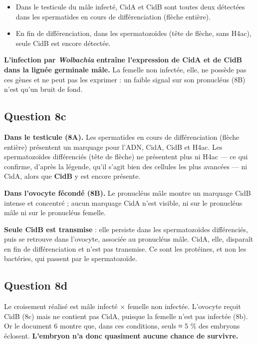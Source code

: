\documentclass[11pt,a4paper]{article}
\providecommand{\tightlist}{\setlength{\itemsep}{0pt}\setlength{\parskip}{0pt}}
\begin{document}
\begin{itemize}
\tightlist
\item
  Dans le testicule du mâle infecté, CidA et CidB sont toutes deux détectées dans les spermatides en cours de différenciation (flèche entière).
\item
  En fin de différenciation, dans les spermatozoïdes (tête de flèche, sans H4ac), seule CidB est encore détectée.
\end{itemize}

\textbf{L'infection par \emph{Wolbachia} entraîne l'expression de CidA et de CidB dans la lignée germinale mâle.} La femelle non infectée, elle, ne possède pas ces gènes et ne peut pas les exprimer : un faible signal sur son pronucléus (8B) n'est qu'un bruit de fond.

\hypertarget{question-8c}{%
\subsection{Question 8c}\label{question-8c}}

\textbf{Dans le testicule (8A).} Les spermatides en cours de différenciation (flèche entière) présentent un marquage pour l'ADN, CidA, CidB et H4ac. Les spermatozoïdes différenciés (tête de flèche) ne présentent plus ni H4ac --- ce qui confirme, d'après la légende, qu'il s'agit bien des cellules les plus avancées --- ni CidA, alors que \textbf{CidB} y est encore présente.

\textbf{Dans l'ovocyte fécondé (8B).} Le pronucléus mâle montre un marquage CidB intense et concentré ; aucun marquage CidA n'est visible, ni sur le pronucléus mâle ni sur le pronucléus femelle.

\textbf{Seule CidB est transmise} : elle persiste dans les spermatozoïdes différenciés, puis se retrouve dans l'ovocyte, associée au pronucléus mâle. CidA, elle, disparaît en fin de différenciation et n'est pas transmise. Ce sont les protéines, et non les bactéries, qui passent par le spermatozoïde.

\hypertarget{question-8d}{%
\subsection{Question 8d}\label{question-8d}}

Le croisement réalisé est mâle infecté × femelle non infectée. L'ovocyte reçoit CidB (8c) mais ne contient pas CidA, puisque la femelle n'est pas infectée (8b). Or le document 6 montre que, dans ces conditions, seuls ≈ 5 \% des embryons éclosent. \textbf{L'embryon n'a donc quasiment aucune chance de survivre.}
\end{document}
